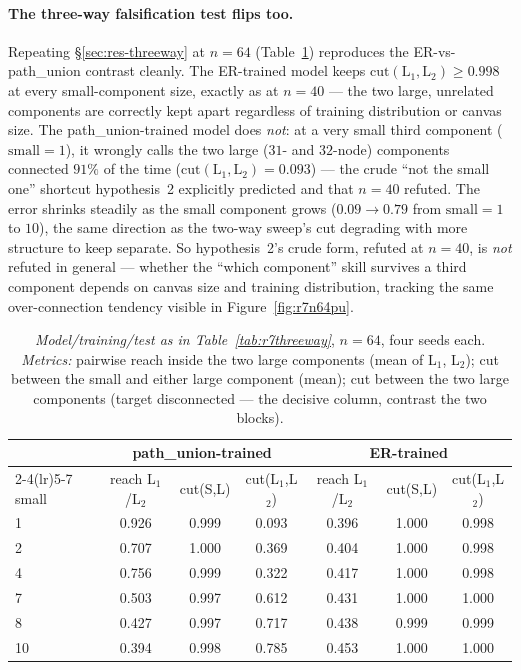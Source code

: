 \documentclass[11pt,a4paper]{article}
\begin{document}
\paragraph{The three-way falsification test flips too.} Repeating
\S\ref{sec:res-threeway} at $n=64$ (Table~\ref{tab:r7n64threeway}) reproduces
the ER-vs-path\_union contrast cleanly. The ER-trained model keeps
$\mathrm{cut}(\mathrm{L}_1,\mathrm{L}_2)\ge0.998$ at every small-component
size, exactly as at $n=40$ --- the two large, unrelated components are
correctly kept apart regardless of training distribution or canvas size. The
path\_union-trained model does \emph{not}: at a very small third component
($\mathrm{small}=1$), it wrongly calls the two large ($31$- and $32$-node)
components connected $91\%$ of the time
($\mathrm{cut}(\mathrm{L}_1,\mathrm{L}_2)=0.093$) --- the crude ``not the small
one'' shortcut hypothesis~2 explicitly predicted and that $n=40$ refuted. The
error shrinks steadily as the small component grows ($0.09\to0.79$ from
$\mathrm{small}=1$ to $10$), the same direction as the two-way sweep's cut
degrading with more structure to keep separate. So hypothesis~2's crude form,
refuted at $n=40$, is \emph{not} refuted in general --- whether the ``which
component'' skill survives a third component depends on canvas size and
training distribution, tracking the same over-connection tendency visible in
Figure~\ref{fig:r7n64pu}.

\begin{table}[H]\centering\small
\begin{tabular}{lcccccc}
\toprule
 & \multicolumn{3}{c}{path\_union-trained} & \multicolumn{3}{c}{ER-trained}\\
\cmidrule(lr){2-4}\cmidrule(lr){5-7}
small & reach L$_1$/L$_2$ & cut(S,L) & cut(L$_1$,L$_2$) & reach L$_1$/L$_2$ & cut(S,L) & cut(L$_1$,L$_2$)\\
\midrule
1  & 0.926 & 0.999 & 0.093 & 0.396 & 1.000 & 0.998\\
2  & 0.707 & 1.000 & 0.369 & 0.404 & 1.000 & 0.998\\
4  & 0.756 & 0.999 & 0.322 & 0.417 & 1.000 & 0.998\\
7  & 0.503 & 0.997 & 0.612 & 0.431 & 1.000 & 1.000\\
8  & 0.427 & 0.997 & 0.717 & 0.438 & 0.999 & 0.999\\
10 & 0.394 & 0.998 & 0.785 & 0.453 & 1.000 & 1.000\\
\bottomrule\end{tabular}
\caption{\emph{Model/training/test as in Table~\ref{tab:r7threeway}}, $n=64$,
four seeds each. \emph{Metrics:} pairwise reach inside the two large components
(mean of L$_1$, L$_2$); cut between the small and either large component
(mean); cut between the two large components (target disconnected --- the
decisive column, contrast the two blocks).}
\label{tab:r7n64threeway}
\end{table}
\end{document}
